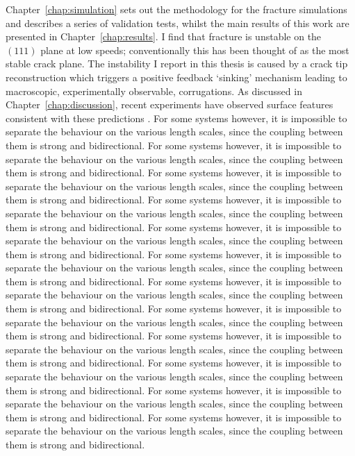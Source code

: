 %
Chapter~\ref{chap:simulation} sets out the methodology for the
fracture simulations and describes a series of validation tests,
whilst the main results of this work are presented in
Chapter~\ref{chap:results}.
%
I find that fracture is unstable on the $(111)$ plane at low speeds;
conventionally this has been thought of as the most stable crack
plane.
%
The instability I report in this thesis is caused by a crack tip
reconstruction which triggers a positive feedback `sinking' mechanism
leading to macroscopic, experimentally observable, corrugations.
%
As discussed in Chapter~\ref{chap:discussion}, recent experiments have
observed surface features consistent with these predictions
\citep{Sherman07,Kermode07}.
%
%
For some systems however, it is impossible to separate the behaviour
on the various length scales, since the coupling between them is
strong and bidirectional.
For some systems however, it is impossible to separate the behaviour
on the various length scales, since the coupling between them is
strong and bidirectional.
For some systems however, it is impossible to separate the behaviour
on the various length scales, since the coupling between them is
strong and bidirectional.
For some systems however, it is impossible to separate the behaviour
on the various length scales, since the coupling between them is
strong and bidirectional.
For some systems however, it is impossible to separate the behaviour
on the various length scales, since the coupling between them is
strong and bidirectional.
For some systems however, it is impossible to separate the behaviour
on the various length scales, since the coupling between them is
strong and bidirectional.
For some systems however, it is impossible to separate the behaviour
on the various length scales, since the coupling between them is
strong and bidirectional.
For some systems however, it is impossible to separate the behaviour
on the various length scales, since the coupling between them is
strong and bidirectional.
For some systems however, it is impossible to separate the behaviour
on the various length scales, since the coupling between them is
strong and bidirectional.
For some systems however, it is impossible to separate the behaviour
on the various length scales, since the coupling between them is
strong and bidirectional.
For some systems however, it is impossible to separate the behaviour
on the various length scales, since the coupling between them is
strong and bidirectional.
For some systems however, it is impossible to separate the behaviour
on the various length scales, since the coupling between them is
strong and bidirectional.
%
